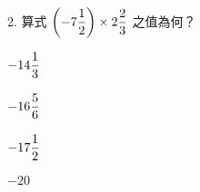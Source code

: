 \documentclass[12pt]{article}
\begin{document}
\begin{problem}
  \item[2.] 算式 $\biggl(-7 \fraction{1}{2}\biggr) \times 2 \fraction{2}{3}$ 之值為何？
  \begin{choices}
    \item $-14 \fraction{1}{3}$
    \item $-16 \fraction{5}{6}$
    \item $-17 \fraction{1}{2}$
    \item $-20$
  \end{choices}
\end{problem}
\end{document}
